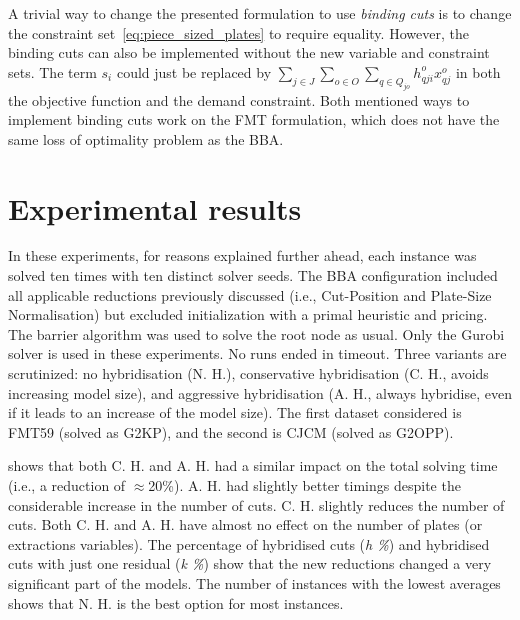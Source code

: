 \documentclass[ppgc,tese,english,formais,babel]{iiufrgs}
\begin{document}
A trivial way to change the presented formulation to use \emph{binding cuts} is to change the constraint set~\eqref{eq:piece_sized_plates} to require equality.
However, the binding cuts can also be implemented without the new variable and constraint sets.
The term \(s_i\) could just be replaced by \(\sum_{j \in J}\sum_{o \in O}\sum_{q \in Q_{jo}} h^o_{qji} x^o_{qj}\) in both the objective function and the demand constraint.
Both mentioned ways to implement binding cuts work on the FMT formulation, which does not have the same loss of optimality problem as the BBA.


\section{Experimental results}

In these experiments, for reasons explained further ahead, each instance was solved ten times with ten distinct solver seeds.
The BBA configuration included all applicable reductions previously discussed (i.e., Cut-Position and Plate-Size Normalisation) but excluded initialization with a primal heuristic and pricing.
The barrier algorithm was used to solve the root node as usual.
Only the Gurobi solver is used in these experiments.
No runs ended in timeout.
Three variants are scrutinized: no hybridisation (N. H.), conservative hybridisation (C. H., avoids increasing model size), and aggressive hybridisation (A. H., always hybridise, even if it leads to an increase of the model size).
The first dataset considered is FMT59 (solved as G2KP), and the second is CJCM (solved as G2OPP).

 shows that both C. H. and A. H. had a similar impact on the total solving time (i.e., a reduction of \(\approx\)20\%).
A. H. had slightly better timings despite the considerable increase in the number of cuts.
C. H. slightly reduces the number of cuts.
Both C. H. and A. H. have almost no effect on the number of plates (or extractions variables).
The percentage of hybridised cuts (\emph{h \%}) and hybridised cuts with just one residual (\emph{k \%}) show that the new reductions changed a very significant part of the models.
The number of instances with the lowest averages shows that N. H. is the best option for most instances.
\end{document}
